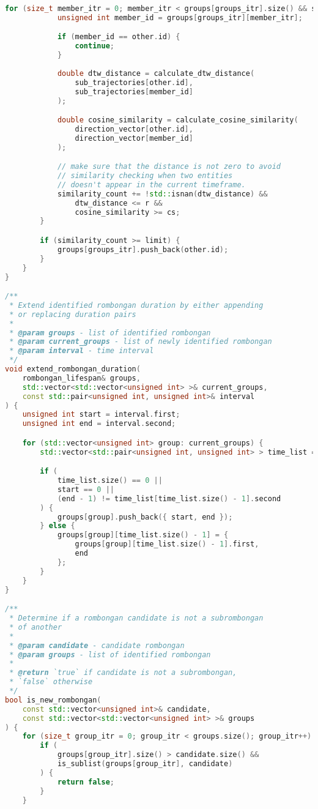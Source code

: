 \begin{lstlisting}[language=C++, caption=Implementasi fungsi \texttt{identify\_rombongan}, label={lamp:identify-rombongan}]
        for (size_t member_itr = 0; member_itr < groups[groups_itr].size() && similarity_count < limit; member_itr++) {
            unsigned int member_id = groups[groups_itr][member_itr];

            if (member_id == other.id) {
                continue;
            }
        
            double dtw_distance = calculate_dtw_distance(
                sub_trajectories[other.id],
                sub_trajectories[member_id]
            );

            double cosine_similarity = calculate_cosine_similarity(
                direction_vector[other.id],
                direction_vector[member_id]
            );

            // make sure that the distance is not zero to avoid
            // similarity checking when two entities
            // doesn't appear in the current timeframe.
            similarity_count += !std::isnan(dtw_distance) &&
                dtw_distance <= r &&
                cosine_similarity >= cs;
        }

        if (similarity_count >= limit) {
            groups[groups_itr].push_back(other.id);
        }
    }
}

/**
 * Extend identified rombongan duration by either appending
 * or replacing duration pairs
 * 
 * @param groups - list of identified rombongan
 * @param current_groups - list of newly identified rombongan
 * @param interval - time interval
 */
void extend_rombongan_duration(
    rombongan_lifespan& groups,
    std::vector<std::vector<unsigned int> >& current_groups,
    const std::pair<unsigned int, unsigned int>& interval
) {
    unsigned int start = interval.first;
    unsigned int end = interval.second;

    for (std::vector<unsigned int> group: current_groups) {
        std::vector<std::pair<unsigned int, unsigned int> > time_list = groups[group];

        if (
            time_list.size() == 0 ||
            start == 0 ||
            (end - 1) != time_list[time_list.size() - 1].second
        ) {
            groups[group].push_back({ start, end });
        } else {
            groups[group][time_list.size() - 1] = { 
                groups[group][time_list.size() - 1].first,
                end
            };
        }
    }
}

/**
 * Determine if a rombongan candidate is not a subrombongan
 * of another
 * 
 * @param candidate - candidate rombongan
 * @param groups - list of identified rombongan
 * 
 * @return `true` if candidate is not a subrombongan,
 * `false` otherwise
 */
bool is_new_rombongan(
    const std::vector<unsigned int>& candidate,
    const std::vector<std::vector<unsigned int> >& groups
) {
    for (size_t group_itr = 0; group_itr < groups.size(); group_itr++) {
        if (
            groups[group_itr].size() > candidate.size() &&
            is_sublist(groups[group_itr], candidate)
        ) {
            return false;
        }
    }


\end{lstlisting}

